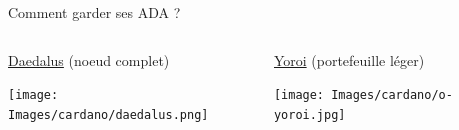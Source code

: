 \documentclass{beamer}
\begin{document}
\begin{frame}[label={sec:org4c2743f}]{Comment garder ses ADA  ?}
  \begin{columns}
    \begin{column}{0.55\columnwidth}
      \begin{block}{}
        \begin{block}{\href{https://daedaluswallet.io}{Daedalus} (noeud complet)}
          \begin{center}
            \texttt{[image: Images/cardano/daedalus.png]}
          \end{center}

        \end{block}
      \end{block}
    \end{column}
    \begin{column}{0.43\columnwidth}
      \begin{block}{\href{https://yoroi-wallet.com}{Yoroi} (portefeuille léger)}
        \begin{center}
          \texttt{[image: Images/cardano/o-yoroi.jpg]}
        \end{center}
      \end{block}
    \end{column}
  \end{columns}
\end{frame}
\end{document}
